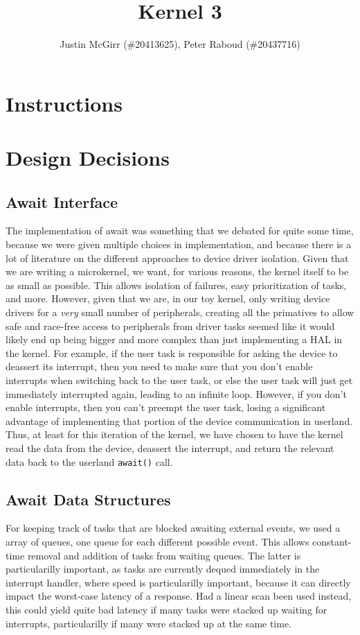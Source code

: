 \documentclass[titlepage]{article}
\begin{document}
\title{Kernel 3}
\author{Justin McGirr (\#20413625), Peter Raboud (\#20437716)}
\maketitle

\section{Instructions}


\section{Design Decisions}
\subsection{Await Interface}
The implementation of await was something that we debated for quite some time,
because we were given multiple choices in implementation, and because there is
a lot of literature on the different approaches to device driver isolation.
Given that we are writing a microkernel, we want, for various reasons, the
kernel itself to be as small as possible. This allows isolation of failures,
easy prioritization of tasks, and more. However, given that we are, in our toy
kernel, only writing device drivers for a \emph{very} small number of
peripherals, creating all the primatives to allow safe and race-free access
to peripherals from driver tasks seemed like it would likely end up being
bigger and more complex than just implementing a HAL in the kernel. For
example, if the user task is responsible for asking the device to deassert
its interrupt, then you need to make sure that you don't enable interrupts
when switching back to the user task, or else the user task will just get
immediately interrupted again, leading to an infinite loop. However, if you
don't enable interrupts, then you can't preempt the user task, losing a
significant advantage of implementing that portion of the device communication
in userland. Thus, at least for this iteration of the kernel, we have chosen
to have the kernel read the data from the device, deassert the interrupt,
and return the relevant data back to the userland \texttt{await()} call.

\subsection{Await Data Structures}
For keeping track of tasks that are blocked awaiting external events, we used
a array of queues, one queue for each different possible event. This allows
constant-time removal and addition of tasks from waiting queues. The latter
is particularilly important, as tasks are currently dequed immediately in the
interrupt handler, where speed is particularilly important, because it can
directly impact the worst-case latency of a response. Had a linear scan been
used instead, this could  yield quite bad latency if many tasks were stacked
up waiting for interrupts, particularilly if many were stacked up at the same
time.
\end{document}
